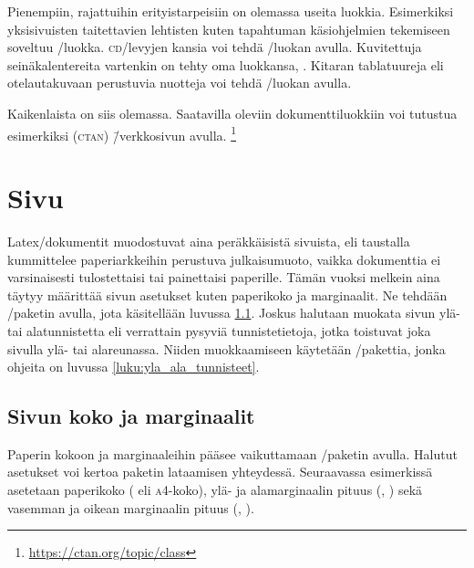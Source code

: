 Pienempiin, rajattuihin erityistarpeisiin on olemassa useita luokkia.
Esimerkiksi yksisivuisten taitettavien lehtisten kuten tapahtuman
käsi\-ohjel\-mien tekemiseen soveltuu \-/luokka.
\textsc{cd}\-/levyjen kansia voi tehdä \-/luokan avulla.
Kuvitettuja seinäkalentereita vartenkin on tehty oma luokkansa,
. Kitaran tablatuureja eli otelautakuvaan
perustuvia nuotteja voi tehdä \-/luokan avulla.

Kaikenlaista on siis olemassa. Saatavilla oleviin dokumenttiluokkiin voi
tutustua esimerkiksi 
(\textsc{ctan}) \=/verkkosivun avulla.%
\footnote{\url{https://ctan.org/topic/class}}

\section{Sivu}
\label{luku:sivuasetukset}

Latex\-/dokumentit muodostuvat aina peräkkäisistä sivuista, eli
taustalla kummittelee paperi\-arkkeihin perustuva julkaisumuoto, vaikka
dokumenttia ei varsinaisesti tulostettaisi tai painettaisi paperille.
Tämän vuoksi melkein aina täytyy määrittää sivun asetukset kuten
paperikoko ja marginaalit. Ne tehdään \-/paketin
avulla, jota käsitellään luvussa \ref{luku:sivun_mitat}. Joskus
halutaan muokata sivun ylä- tai alatunnistetta eli verrattain pysyviä
tunnistetietoja, jotka toistuvat joka sivulla ylä- tai alareunassa.
Niiden muokkaamiseen käytetään \-/pakettia, jonka
ohjeita on luvussa \ref{luku:yla_ala_tunnisteet}.

\subsection{Sivun koko ja marginaalit}
\label{luku:sivun_mitat}

Paperin kokoon ja marginaaleihin pääsee vaikuttamaan
\-/paketin avulla. Halutut asetukset
voi kertoa paketin lataamisen yhteydessä. Seuraavassa esimerkissä
asetetaan paperikoko ( eli \textsc{a4}-koko), ylä- ja
alamarginaalin pituus (, ) sekä vasemman ja
oikean marginaalin pituus (, ).

\begin{koodilohkosis}
  \usepackage[a4paper, top=20mm, bottom=30mm,
    left=20mm, right=20mm]{geometry}
\end{koodilohkosis}

